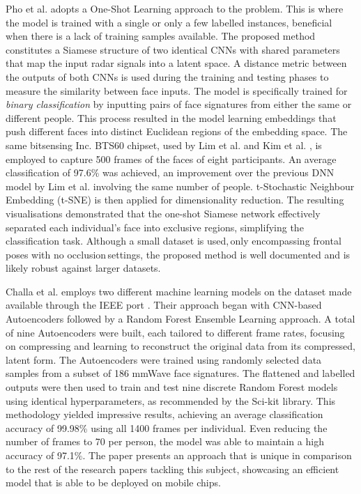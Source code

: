 \documentclass{mpaper}
\begin{document}
Pho et al. \cite{pho2021radar} adopts a One-Shot Learning approach to the problem. This is where the model is trained with a single or only a few labelled instances, beneficial when there is a lack of training samples available. The proposed method constitutes a Siamese structure of two identical CNNs with shared parameters that map the input radar signals into a latent space. A distance metric between the outputs of both CNNs is used during the training and testing phases to measure the similarity between face inputs. The model is specifically trained for \textit{binary classification} by inputting pairs of face signatures from either the same or different people. This process resulted in the model learning embeddings that push different faces into distinct Euclidean regions of the embedding space. The same bitsensing Inc. BTS60 chipset, used by Lim et al. and Kim et al. \cite{lim2020dnn, kim2020face}, is employed to capture 500 frames of the faces of eight participants. An average classification of 97.6\% was achieved, an improvement over the previous DNN model by Lim et al. involving the same number of people. t-Stochastic Neighbour Embedding (t-SNE) \cite{van2008visualizing} is then applied for dimensionality reduction. The resulting visualisations demonstrated that the one-shot Siamese network effectively separated each individual's face into exclusive regions, simplifying the classification task. Although a small dataset is used,\,only encompassing frontal poses with no occlusion\,settings, the proposed method is well documented and is likely robust against larger datasets.

Challa et al. \cite{challa2021face} employs two different machine learning models on the dataset made available through the IEEE port \cite{mmwavefacedata}. Their approach began with CNN-based Autoencoders followed by a Random Forest Ensemble Learning approach. A total of nine Autoencoders were built, each tailored to different frame rates, focusing on compressing and learning to reconstruct the original data from its compressed, latent form. The Autoencoders were trained using randomly selected data samples from a subset of 186 mmWave face signatures. The flattened and labelled outputs were then used to train and test nine discrete Random Forest models using identical hyperparameters, as recommended by the Sci-kit library. This methodology yielded impressive results, achieving an average classification accuracy of 99.98\% using all 1400 frames per individual. Even reducing the number of frames to 70 per person, the model was able to maintain a high accuracy of 97.1\%. The paper presents an approach that is unique in comparison to the rest of the research papers tackling this subject, showcasing an efficient model that is able to be deployed on mobile chips.
\end{document}
